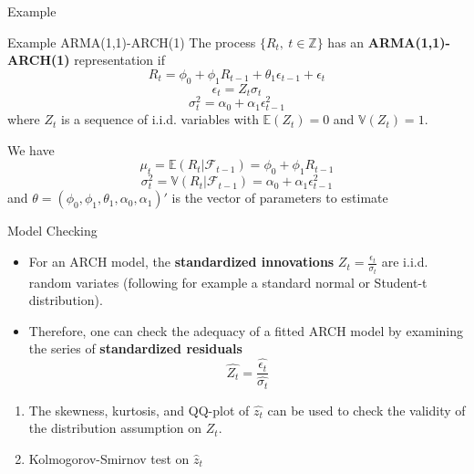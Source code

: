 \documentclass{beamer}
\def\Z{\mathbb{Z}}
\def\Esp{\mathbb{E}}
\def\Var{\mathbb{V}}
\def\N{\mathcal{N}}
\def\F{\mathcal{F}}
\begin{document}
\begin{frame}{Example}
    \begin{exampleblock}{Example ARMA(1,1)-ARCH(1)}
    \small
    The process $\{R_t, ~t\in\Z\}$ has an \textbf{ARMA(1,1)-ARCH(1)} representation if
        $$R_t = \phi_0 + \phi_1 R_{t-1}+ \theta_1\epsilon_{t-1} + \epsilon_t $$
        $$\epsilon_t = Z_t\sigma_t$$
        $$\sigma_t^2 = \alpha_0 + \alpha_1\epsilon_{t-1}^2$$
        where $Z_t$ is a sequence of i.i.d. variables with $\Esp(Z_t)=0$ and $\Var(Z_t)=1$. 
        
        We have
        $$\mu_t = \Esp(R_t|\F_{t-1}) =  \phi_0 + \phi_1 R_{t-1}$$
        $$\sigma_t^2 =\Var(R_t|\F_{t-1}) = \alpha_0 + \alpha_1\epsilon_{t-1}^2$$
        and $\theta = (\phi_0, \phi_1, \theta_1, \alpha_0, \alpha_1)' $ is the vector of parameters to estimate
    \end{exampleblock}
\end{frame}


\begin{frame}{Model Checking}
    \begin{itemize}
        \item For an ARCH model, the \textbf{standardized innovations} $Z_t = \frac{\epsilon_t}{\sigma_t}$
        are i.i.d. random variates (following for example a standard normal or Student-t distribution).
        \item Therefore, one can check the adequacy of a fitted ARCH model by examining the series of \textbf{standardized residuals}
        $$\hat{Z_t} = \frac{\hat{\epsilon_t}}{\hat{\sigma_t}}$$
    \end{itemize}
    
    \begin{enumerate}
        
        \item The skewness, kurtosis, and QQ-plot of $\hat{z_t}$ can be used to check the validity of the distribution assumption on $Z_t$.

        \item Kolmogorov-Smirnov test on $\hat{z}_t$
    \end{enumerate}
\end{frame}
\end{document}
